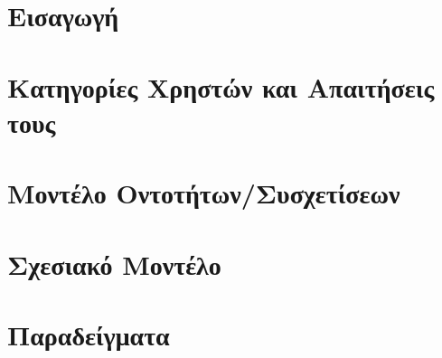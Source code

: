 \documentclass[12pt]{article}
\begin{document}
\maketitle \newpage
{}
\tableofcontents \newpage
\listoffigures
\listoftables
\newpage

\section{Εισαγωγή}


\section{Κατηγορίες Χρηστών και Απαιτήσεις τους}


\section{Μοντέλο Οντοτήτων/Συσχετίσεων}


\section{Σχεσιακό Μοντέλο}


\section{Παραδείγματα}

\end{document}
